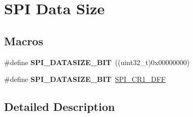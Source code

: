 \hypertarget{group___s_p_i__data__size}{}\section{S\+PI Data Size}
\label{group___s_p_i__data__size}
\subsection*{Macros}
\begin{DoxyCompactItemize}
\item 
\#define {\bfseries S\+P\+I\+\_\+\+D\+A\+T\+A\+S\+I\+Z\+E\+\_\+B\+IT}~((uint32\+\_\+t)0x00000000)\hypertarget{group___s_p_i__data__size_ga773e9fc5d44c9661c829361fbd073152}{}\label{group___s_p_i__data__size_ga773e9fc5d44c9661c829361fbd073152}

\item 
\#define {\bfseries S\+P\+I\+\_\+\+D\+A\+T\+A\+S\+I\+Z\+E\+\_\+B\+IT}~\hyperlink{group___peripheral___registers___bits___definition_ga3ffabea0de695a19198d906bf6a1d9fd}{S\+P\+I\+\_\+\+C\+R1\+\_\+\+D\+FF}\hypertarget{group___s_p_i__data__size_ga902147b9ead27cd9333240c72ce74f59}{}\label{group___s_p_i__data__size_ga902147b9ead27cd9333240c72ce74f59}

\end{DoxyCompactItemize}


\subsection{Detailed Description}
